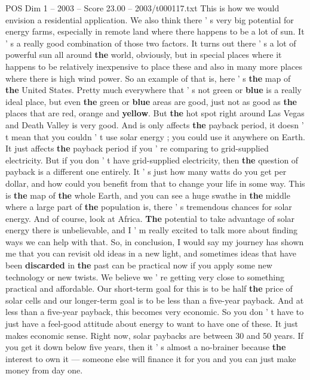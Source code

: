 \begin{textsample}{POS Dim 1 – 2003 – Score 23.00 – 2003/t000117.txt}
This is how we would envision a residential application.
We also think there ' s very big potential for energy farms, especially in remote land where there happens to be a lot of sun.
It ' s a really good combination of those two factors.
It turns out there ' s a lot of powerful sun all around \textbf{the} world, obviously, but in special places where it happens to be relatively inexpensive to place these and also in many more places where there is high wind power.
So an example of that is, here ' s \textbf{the} map of \textbf{the} United States.
Pretty much everywhere that ' s not green or \textbf{blue} is a really ideal place, but even \textbf{the} green or \textbf{blue} areas are good, just not as good as \textbf{the} places that are red, orange and \textbf{yellow}.
But \textbf{the} hot spot right around Las Vegas and Death Valley is very good.
And is only affects \textbf{the} payback period, it doesn ' t mean that you couldn ' t use solar energy ; you could use it anywhere on Earth.
It just affects \textbf{the} payback period if you ' re comparing to grid-supplied electricity.
But if you don ' t have grid-supplied electricity, then \textbf{the} question of payback is a different one entirely.
It ' s just how many watts do you get per dollar, and how could you benefit from that to change your life in some way.
This is \textbf{the} map of \textbf{the} whole Earth, and you can see a huge swathe in \textbf{the} middle where a large part of \textbf{the} population is, there ' s tremendous chances for solar energy.
And of course, look at Africa. \textbf{The} potential to take advantage of solar energy there is unbelievable, and I ' m really excited to talk more about finding ways we can help with that.
So, in conclusion, I would say my journey has shown me that you can revisit old ideas in a new light, and sometimes ideas that have been \textbf{discarded} in \textbf{the} past can be practical now if you apply some new technology or new twists.
We believe we ' re getting very close to something practical and affordable.
Our short-term goal for this is to be half \textbf{the} price of solar cells and our longer-term goal is to be less than a five-year payback.
And at less than a five-year payback, this becomes very economic.
So you don ' t have to just have a feel-good attitude about energy to want to have one of these.
It just makes economic sense.
Right now, solar paybacks are between 30 and 50 years.
If you get it down below five years, then it ' s almost a no-brainer because \textbf{the} interest to own it — someone else will finance it for you and you can just make money from day one.

\end{textsample}
